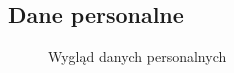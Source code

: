 \begin{flushleft}
    \subsection{\Large{Dane personalne}}
    \begin{figure}[H]
    \centering
    \caption{Wygląd danych personalnych}
    \label{fig:dane_person}
    \end{figure}
    \newpage

\end{flushleft}
